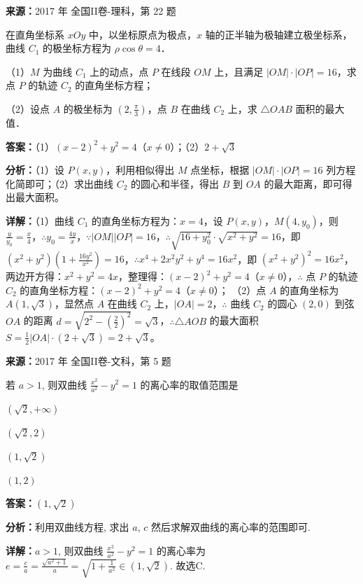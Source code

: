 \begin{question}[points=10]
\textbf{来源：}2017 年 全国II卷-理科，第 22 题\par
[选修4-4：坐标系与参数方程]

在直角坐标系 $xOy$ 中，以坐标原点为极点，$x$ 轴的正半轴为极轴建立极坐标系，曲线 $C_1$ 的极坐标方程为 $\rho\cos\theta=4$．

（1）$M$ 为曲线 $C_1$ 上的动点，点 $P$ 在线段 $OM$ 上，且满足 $|OM|\cdot|OP|=16$，求点 $P$ 的轨迹 $C_2$ 的直角坐标方程；

（2）设点 $A$ 的极坐标为 $(2,\frac{\pi}{3})$，点 $B$ 在曲线 $C_2$ 上，求 $\triangle OAB$ 面积的最大值．
\begin{solution}
\textbf{答案：}（1）$(x-2)^2+y^2=4$（$x\neq0$）；（2）$2+\sqrt{3}$

\textbf{分析：}（1）设 $P(x,y)$，利用相似得出 $M$ 点坐标，根据 $|OM|\cdot|OP|=16$ 列方程化简即可；（2）求出曲线 $C_2$ 的圆心和半径，得出 $B$ 到 $OA$ 的最大距离，即可得出最大面积。

\textbf{详解：}（1）曲线 $C_1$ 的直角坐标方程为：$x=4$，设 $P(x,y)$，$M(4,y_0)$，则 $\frac{y}{y_0}=\frac{x}{4}$，$\therefore y_0=\frac{4y}{x}$，$\because|OM||OP|=16$，$\therefore\sqrt{16+y_0^2}\cdot\sqrt{x^2+y^2}=16$，即 $(x^2+y^2)(1+\frac{16y^2}{x^2})=16$，$\therefore x^4+2x^2y^2+y^4=16x^2$，即 $(x^2+y^2)^2=16x^2$，两边开方得：$x^2+y^2=4x$，整理得：$(x-2)^2+y^2=4$（$x\neq0$），$\therefore$ 点 $P$ 的轨迹 $C_2$ 的直角坐标方程：$(x-2)^2+y^2=4$（$x\neq0$）；
（2）点 $A$ 的直角坐标为 $A(1,\sqrt{3})$，显然点 $A$ 在曲线 $C_2$ 上，$|OA|=2$，$\therefore$ 曲线 $C_2$ 的圆心 $(2,0)$ 到弦 $OA$ 的距离 $d=\sqrt{2^2-(\frac{2}{2})^2}=\sqrt{3}$，$\therefore\triangle AOB$ 的最大面积 $S=\frac{1}{2}|OA|\cdot(2+\sqrt{3})=2+\sqrt{3}$。
\end{solution}
\end{question}

\begin{question}[points=5]
\textbf{来源：}2017 年 全国II卷-文科，第 5 题\par
若 $a>1$, 则双曲线 $\frac{x^2}{a^2}-y^2=1$ 的离心率的取值范围是
\begin{choices}
  \item $(\sqrt{2},+\infty)$
  \item $(\sqrt{2},2)$
  \item $(1,\sqrt{2})$
  \item $(1,2)$
\end{choices}
\begin{solution}
\textbf{答案：}$(1,\sqrt{2})$

\textbf{分析：}利用双曲线方程, 求出 $a$, $c$ 然后求解双曲线的离心率的范围即可.

\textbf{详解：}$a>1$, 则双曲线 $\frac{x^2}{a^2}-y^2=1$ 的离心率为 $e=\frac{c}{a}=\frac{\sqrt{a^2+1}}{a}=\sqrt{1+\frac{1}{a^2}}\in(1,\sqrt{2})$. 故选C.
\end{solution}
\end{question}

